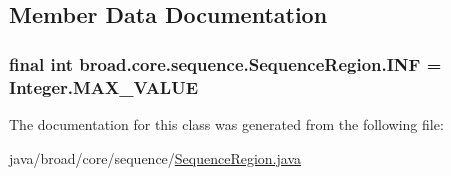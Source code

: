 \subsection{Member Data Documentation}
\hypertarget{classbroad_1_1core_1_1sequence_1_1_sequence_region_ad709c721bc2e22de2f16c1af52721d6f}{
\subsubsection[{I\+N\+F}]{\setlength{\rightskip}{0pt plus 5cm}final int broad.\+core.\+sequence.\+Sequence\+Region.\+I\+N\+F = Integer.\+M\+A\+X\+\_\+\+V\+A\+L\+U\+E\hspace{0.3cm}{\ttfamily [static]}}}\label{classbroad_1_1core_1_1sequence_1_1_sequence_region_ad709c721bc2e22de2f16c1af52721d6f}


The documentation for this class was generated from the following file\+:\begin{DoxyCompactItemize}
\item 
java/broad/core/sequence/\hyperlink{_sequence_region_8java}{Sequence\+Region.\+java}\end{DoxyCompactItemize}
